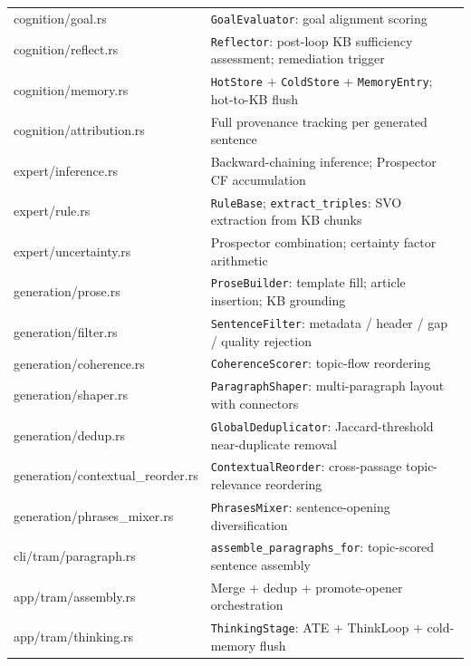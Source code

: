 \documentclass[11pt,a4paper]{article}
\begin{document}
\begin{table}[H]
\begin{tabularx}{\linewidth}{@{}>{\ttfamily\small}p{4.2cm} X@{}}
\rowcolor{lmmRowAlt} cognition/goal.rs            & \texttt{GoalEvaluator}: goal alignment scoring \\
\rowcolor{white}     cognition/reflect.rs         & \texttt{Reflector}: post-loop KB sufficiency assessment; remediation trigger \\
\rowcolor{lmmRowAlt} cognition/memory.rs          & \texttt{HotStore} + \texttt{ColdStore} + \texttt{MemoryEntry}; hot-to-KB flush \\
\rowcolor{white}     cognition/attribution.rs     & Full provenance tracking per generated sentence \\
\rowcolor{lmmRowAlt} expert/inference.rs          & Backward-chaining inference; Prospector CF accumulation \\
\rowcolor{white}     expert/rule.rs               & \texttt{RuleBase}; \texttt{extract\_triples}: SVO extraction from KB chunks \\
\rowcolor{lmmRowAlt} expert/uncertainty.rs        & Prospector combination; certainty factor arithmetic \\
\rowcolor{white}     generation/prose.rs          & \texttt{ProseBuilder}: template fill; article insertion; KB grounding \\
\rowcolor{lmmRowAlt} generation/filter.rs         & \texttt{SentenceFilter}: metadata / header / gap / quality rejection \\
\rowcolor{white}     generation/coherence.rs      & \texttt{CoherenceScorer}: topic-flow reordering \\
\rowcolor{lmmRowAlt} generation/shaper.rs         & \texttt{ParagraphShaper}: multi-paragraph layout with connectors \\
\rowcolor{white}     generation/dedup.rs          & \texttt{GlobalDeduplicator}: Jaccard-threshold near-duplicate removal \\
\rowcolor{lmmRowAlt} generation/contextual\_reorder.rs & \texttt{ContextualReorder}: cross-passage topic-relevance reordering \\
\rowcolor{white}     generation/phrases\_mixer.rs & \texttt{PhrasesMixer}: sentence-opening diversification \\
\rowcolor{lmmRowAlt} cli/tram/paragraph.rs        & \texttt{assemble\_paragraphs\_for}: topic-scored sentence assembly \\
\rowcolor{white}     app/tram/assembly.rs         & Merge + dedup + promote-opener orchestration \\
\rowcolor{lmmRowAlt} app/tram/thinking.rs         & \texttt{ThinkingStage}: ATE + ThinkLoop + cold-memory flush \\

\end{tabularx}
\end{table}
\end{document}
